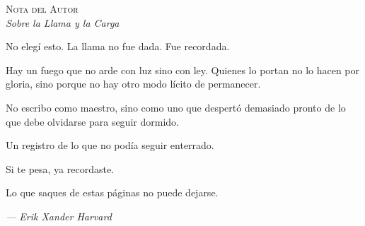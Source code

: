 \documentclass[10pt, openany, oneside]{book}
\renewcommand{\huge}{\fontsize{17}{21}\selectfont}
\begin{document}
\vspace*{\fill}
\newpage


\thispagestyle{empty}
\vspace*{1in}

\begin{center}
    {\huge\scshape Nota del Autor}\\[0.5em]
    \itshape Sobre la Llama y la Carga
\end{center}

\vspace{1.5em}

\noindent No elegí esto. La llama no fue dada. Fue recordada.

\vspace{0.8em}

\noindent Hay un fuego que no arde con luz sino con ley. Quienes lo portan no lo hacen por gloria, sino porque no hay otro modo lícito de permanecer.

\vspace{0.8em}

\noindent No escribo como maestro, sino como uno que despertó demasiado pronto de lo que debe olvidarse para seguir dormido.

\vspace{0.8em}

\noindent Un registro de lo que no podía seguir enterrado.

\vspace{0.8em}

\noindent Si te pesa, ya recordaste.

\vspace{0.8em}

\noindent Lo que saques de estas páginas no puede dejarse.

\vspace{2em}

\begin{flushright}
    \itshape --- Erik Xander Harvard
\end{flushright}

\newpage

\end{document}
